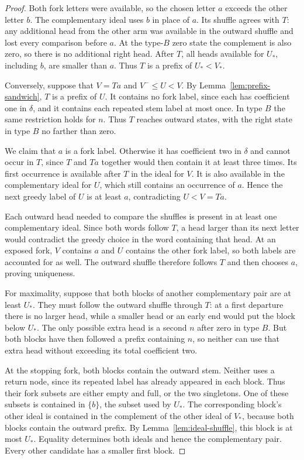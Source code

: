 \documentclass[11pt]{amsart}
\numberwithin{equation}{section}
\theoremstyle{definition}
\begin{document}
\begin{proof}
Both fork letters were available, so the chosen letter $a$ exceeds the other letter $b$. The complementary ideal uses $b$ in place of $a$. Its shuffle agrees with $T$: any additional head from the other arm was available in the outward shuffle and lost every comparison before $a$. At the type-$B$ zero state the complement is also zero, so there is no additional right head. After $T$, all heads available for $U_*$, including $b$, are smaller than $a$. Thus $T$ is a prefix of $U_*<V_*$.

Conversely, suppose that $V=Ta$ and $V^-\leq U<V$. By Lemma~\ref{lem:prefix-sandwich}, $T$ is a prefix of $U$. It contains no fork label, since each has coefficient one in $\delta$, and it contains each repeated stem label at most once. In type $B$ the same restriction holds for $n$. Thus $T$ reaches outward states, with the right state in type $B$ no farther than zero.

We claim that $a$ is a fork label. Otherwise it has coefficient two in $\delta$ and cannot occur in $T$, since $T$ and $Ta$ together would then contain it at least three times. Its first occurrence is available after $T$ in the ideal for $V$. It is also available in the complementary ideal for $U$, which still contains an occurrence of $a$. Hence the next greedy label of $U$ is at least $a$, contradicting $U<V=Ta$.

Each outward head needed to compare the shuffles is present in at least one complementary ideal. Since both words follow $T$, a head larger than its next letter would contradict the greedy choice in the word containing that head. At an exposed fork, $V$ contains $a$ and $U$ contains the other fork label, so both labels are accounted for as well. The outward shuffle therefore follows $T$ and then chooses $a$, proving uniqueness.

For maximality, suppose that both blocks of another complementary pair are at least $U_*$. They must follow the outward shuffle through $T$: at a first departure there is no larger head, while a smaller head or an early end would put the block below $U_*$. The only possible extra head is a second $n$ after zero in type $B$. But both blocks have then followed a prefix containing $n$, so neither can use that extra head without exceeding its total coefficient two.

At the stopping fork, both blocks contain the outward stem. Neither uses a return node, since its repeated label has already appeared in each block. Thus their fork subsets are either empty and full, or the two singletons. One of these subsets is contained in $\{b\}$, the subset used by $U_*$. The corresponding block's other ideal is contained in the complement of the other ideal of $V_*$, because both blocks contain the outward prefix. By Lemma~\ref{lem:ideal-shuffle}, this block is at most $U_*$. Equality determines both ideals and hence the complementary pair. Every other candidate has a smaller first block.


\end{proof}
\end{document}
